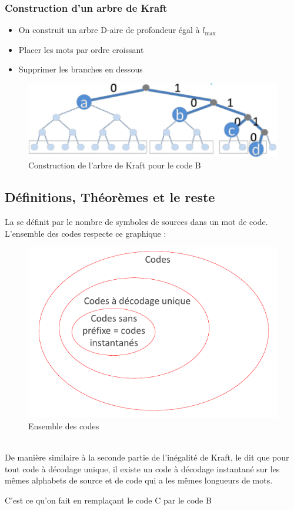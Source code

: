 \documentclass[11pt,a4paper]{article}
\renewcommand{\)}{\right)}
\renewcommand{\(}{\left(}
\begin{document}
\subsubsection{Construction d'un arbre de Kraft}
\begin{itemize}
	\item On construit un arbre D-aire de profondeur égal à $l_{\max}$
	\item Placer les mots par ordre croissant
	\item Supprimer les branches en dessous
\end{itemize}
\begin{figure}[!h]
	\centering	
	\includegraphics[scale=0.3]{images/arbre_Kraft}
	\caption{Construction de l'arbre de Kraft pour le code B}
	\label{Arbre Kraft}
\end{figure}

\subsection{Définitions, Théorèmes et le reste}

La  se définit par le nombre de symboles de sources dans un mot de code.\\
L'ensemble des codes respecte ce graphique :
\begin{figure}[!h]
	\centering
	\caption{Ensemble des codes}
	\includegraphics[scale=0.5]{images/tout_code}
\end{figure}\\
De manière similaire à la seconde partie de l'inégalité de Kraft, le  dit que pour tout code à décodage unique, il existe un code à décodage instantané sur les mêmes alphabets de source et de code qui a les mêmes longueurs de mots.
\begin{exemple}[0.7]
	C'est ce qu'on fait en remplaçant le code C par le code B
\end{exemple}
\end{document}
